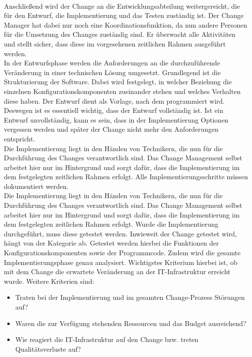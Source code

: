 \\
Anschließend wird der Change an die Entwicklungsabteilung weitergereicht, die für den Entwurf, die Implementierung und das Testen zuständig ist. Der Change Manager hat dabei nur noch eine Koordinationsfunktion, da nun andere Personen für die Umsetzung des Changes zuständig sind. Er überwacht alle Aktivitäten und stellt sicher, dass diese im vorgesehenen zeitlichen Rahmen ausgeführt werden.
\\
In der Entwurfsphase werden die Anforderungen an die durchzuführende Veränderung in einer technischen Lösung umgesetzt. Grundlegend ist die Strukturierung der Software. Dabei wird festgelegt, in welcher Beziehung die einzelnen Konfigurationskomponenten zueinander stehen und welches Verhalten diese haben. Der Entwurf dient als Vorlage, nach dem programmiert wird. Deswegen ist es essentiell wichtig, dass der Entwurf vollständig ist. Ist ein Entwurf unvollständig, kann es sein, dass in der Implementierung Optionen vergessen werden und später der Change nicht mehr den Anforderungen entspricht. 
\\
Die Implementierung liegt in den Händen von Technikern, die nun für die Durchführung des Changes verantwortlich sind. Das Change Management selbst arbeitet hier nur im Hintergrund und sorgt dafür, dass die Implementierung im dem festgelegten zeitlichen Rahmen erfolgt. Alle Implementierungsschritte müssen dokumentiert werden. 
\\
Die Implementierung liegt in den Händen von Technikern, die nun für die Durchführung des Changes verantwortlich sind. Das Change Management selbst arbeitet hier nur im Hintergrund und sorgt dafür, dass die Implementierung im dem festgelegten zeitlichen Rahmen erfolgt. Wurde die Implementierung durchgeführt, muss diese getestet werden. Inwieweit der Change getestet wird, hängt von der Kategorie ab. Getestet werden hierbei die Funktionen der Konfigurationskomponenten sowie der Programmcode. Zudem wird die gesamte Implementierungsphase genau analysiert. Wichtigstes Kriterium hierbei ist, ob mit dem Change die erwartete Veränderung an der IT-Infrastruktur erreicht wurde. Weitere Kriterien sind:
\begin{itemize}
	\item 	Traten bei der Implementierung und im gesamten Change-Prozess Störungen auf?
	\item 	Waren die zur Verfügung stehenden Ressourcen und das Budget ausreichend?
	\item Wie reagiert die IT-Infrastruktur auf den Change bzw. treten Qualitätsverluste auf?
\end{itemize}
